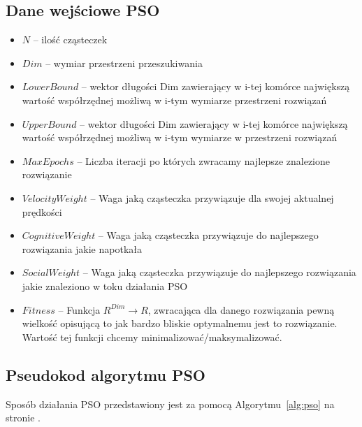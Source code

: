 \documentclass{../llncs_template_final/llncs}
\begin{document}
\subsection{Dane wejściowe PSO}
\begin{itemize}
\item $N$ -- ilość cząsteczek
\item $Dim$ -- wymiar przestrzeni przeszukiwania
\item $LowerBound$ -- wektor długości Dim zawierający w i-tej komórce największą wartość współrzędnej możliwą w i-tym wymiarze przestrzeni rozwiązań
\item $UpperBound$ -- wektor długości Dim zawierający w i-tej komórce największą wartość współrzędnej możliwą w i-tym wymiarze w przestrzeni rozwiązań
\item $MaxEpochs$ -- Liczba iteracji po których zwracamy najlepsze znalezione rozwiązanie
\item $VelocityWeight$ -- Waga jaką cząsteczka przywiązuje dla swojej aktualnej prędkości
\item $CognitiveWeight$ -- Waga jaką cząsteczka przywiązuje do najlepszego rozwiązania jakie napotkała
\item $SocialWeight$ -- Waga jaką cząsteczka przywiązuje do najlepszego rozwiązania jakie znaleziono w toku działania PSO
\item $Fitness$ -- Funkcja $R^{Dim} \rightarrow R$, zwracająca dla danego rozwiązania pewną wielkość opisującą to jak bardzo bliskie optymalnemu jest to rozwiązanie. Wartość tej funkcji chcemy minimalizować/maksymalizować. 
\end{itemize}

\subsection*{Pseudokod algorytmu PSO}

Sposób działania PSO przedstawiony jest za pomocą Algorytmu~\ref{alg:pso} na stronie \pageref{alg:pso}.
\end{document}
